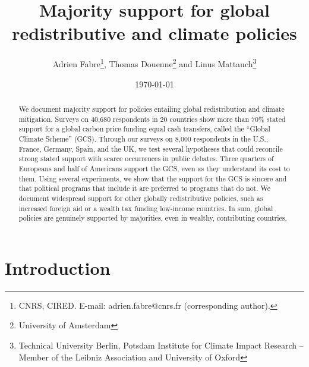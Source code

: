 \documentclass[12pt,english]{article}
\title{Majority support for global redistributive and climate policies
}
\author{Adrien Fabre\footnote{CNRS, CIRED. E-mail: adrien.fabre@cnrs.fr (corresponding author).}, Thomas Douenne\footnote{University of Amsterdam}\; and Linus Mattauch\footnote{Technical University Berlin, Potsdam Institute for Climate Impact Research -- Member of the Leibniz Association and University of Oxford}
} %
\date{\today} %
\begin{document}
\maketitle

\begin{center}
\end{center}

\begin{abstract}

  We document majority support for policies entailing global redistribution and climate mitigation. Surveys on 40,680 respondents in 20 countries show more than 70\% stated support for a global carbon price funding equal cash transfers, called the ``Global Climate Scheme'' (GCS). Through our %
  surveys on 8,000 respondents in the U.S., France, Germany, Spain, and the UK, we test several hypotheses that could reconcile strong stated support with scarce occurrences in public debates. 
  Three quarters of Europeans and half of Americans support the GCS, even as they understand its cost to them. Using several experiments, we show that the support for the GCS is sincere and that political programs that include it are preferred to programs that do not. %
  We document widespread support for other globally redistributive policies, such as increased foreign aid or a wealth tax funding low-income countries. In sum, global policies are genuinely supported by majorities, even in wealthy, contributing countries. 
\end{abstract}

\tableofcontents

\onehalfspacing %
\section{Introduction}%
\end{document}
